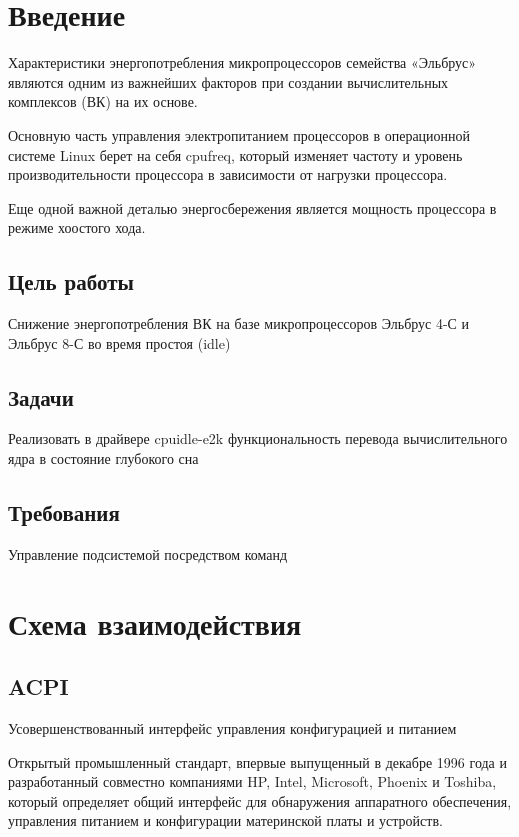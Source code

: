 \documentclass{article}
\begin{document}


\tableofcontents

\newpage

\section{Введение}

Характеристики энергопотребления микропроцессоров семейства «Эльбрус»
являются одним из важнейших факторов при создании вычислительных комплексов (ВК)
на их основе.

Основную часть управления электропитанием процессоров в операционной системе Linux берет на себя cpufreq, который изменяет частоту и уровень производительности процессора в зависимости от нагрузки процессора.

Еще одной важной деталью энергосбережения является мощность процессора в режиме хоостого хода.

\subsection{Цель работы}
Снижение энергопотребления ВК на базе микропроцессоров Эльбрус 4-С и Эльбрус 8-С во время простоя (idle)
\subsection{Задачи}
Реализовать в драйвере cpuidle-e2k функциональность перевода вычислительного ядра в состояние глубокого сна
\subsection{Требования}
Управление подсистемой посредством команд

\newpage
\section{Схема взаимодействия}

\subsection{ACPI}
Усовершенствованный интерфейс управления конфигурацией и питанием

Открытый промышленный стандарт, впервые выпущенный в декабре 1996 года и разработанный совместно компаниями HP, Intel, Microsoft, Phoenix и Toshiba, который определяет общий интерфейс для обнаружения аппаратного обеспечения, управления питанием и конфигурации материнской платы и устройств.
\end{document}
